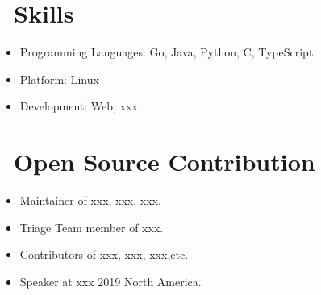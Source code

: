 \documentclass{resume}
\begin{document}
\section{\faCogs\ Skills}
\begin{itemize}[parsep=0.5ex]
  \item Programming Languages: Go, Java, Python, C, TypeScript
  \item Platform: Linux
  \item Development: Web, xxx
\end{itemize}

\section{\faInfo\ Open Source Contribution}
\begin{itemize}[parsep=0.5ex]
  \item Maintainer of xxx, xxx, xxx.
  \item Triage Team member of xxx.
  \item Contributors of xxx, xxx, xxx,etc.
  \item Speaker at xxx 2019 North America.
\end{itemize}
\end{document}
